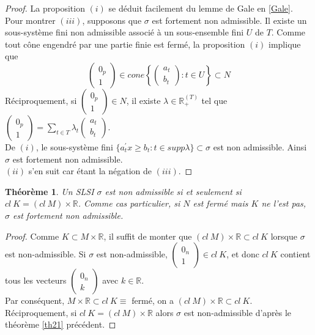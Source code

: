 \documentclass[11pt]{report}
\newenvironment{boxtheorem}
{\begin{tcolorbox}
		[enhanced jigsaw,breakable,pad at break*=2mm,
		colback=black!5,colframe=bleueLeger]}
	{\end{tcolorbox}}
\theoremstyle{styletheorem}
\newtheorem{theoreme}{Théorème}[section]
\newenvironment{theorem}
{\vspace*{0.3cm}\begin{boxtheorem}\begin{theoreme}}{\end{theoreme}\end{boxtheorem}\vspace*{0.3cm}}
\theoremstyle{styledef}
\theoremstyle{remark}
\newcommand{\ssi}{si et seulement si\  }
\newcommand{\R}{\ensuremath{\mathbb{R}}}
\begin{document}
\begin{proof}
	La proposition $(i)$ se déduit facilement du lemme de Gale en \ref{Gale}.
	Pour montrer $(iii)$, supposons que $\sigma$ est fortement non admissible. Il existe un sous-système fini non admissible associé à un sous-ensemble fini $U$ de $T$. Comme tout cône engendré par une partie  finie est fermé, la proposition $(i)$ implique que 
	$$\begin{pmatrix}
		0_p\\ 1
	\end{pmatrix} \in cone\left \lbrace \begin{pmatrix}
		a_t\\ b_t
	\end{pmatrix} \colon t \in U \right \rbrace \subset N$$
	Réciproquement, si $\begin{pmatrix}
		0_p\\ 1
	\end{pmatrix} \in N$, il existe $\lambda \in \R_+^{(T)}$ tel que $\begin{pmatrix}
		0_p\\ 1
	\end{pmatrix} =\sum_{t \in T} \lambda_t \begin{pmatrix}
		a_t\\ b_t
	\end{pmatrix}$.\\
	De $(i)$, le sous-système fini $\lbrace a_t^\prime  x \geq b_t \colon t \in supp\lambda \rbrace \subset \sigma $ est non admissible. Ainsi $\sigma$ est fortement non admissible.\\
	$(ii)$ s'en suit car étant la négation de $(iii)$.
\end{proof}
\begin{theorem}
	Un SLSI $\sigma$ est non admissible \ssi $cl\ K = (cl\ M)\times \R$. Comme cas particulier, si $N$ est fermé mais $K$ ne l'est pas, $\sigma$ est fortement non admissible.
\end{theorem}
\begin{proof}
	Comme $K \subset M\times \R$, il suffit de monter que $(cl \ M )\times \R \subset cl\ K$ lorsque $\sigma$ est non-admissible. Si $\sigma$ est non-admissible, $\begin{pmatrix}
		0_n\\ 1
	\end{pmatrix} \in cl\ K$, et donc $cl \ K$ contient tous les vecteurs $\begin{pmatrix}
		0_n\\ k
	\end{pmatrix} $ avec $k \in \R$.\\
	Par conséquent, $M\times \R \subset cl\ K\equiv$ fermé, on a $(cl\ M) \times \R \subset cl\ K$.\\ 
	Réciproquement, si $cl\ K=(cl\ M)\times \R$ alors $\sigma$ est non-admissible d'après le théorème \ref{th21} précédent.
	
\end{proof}
\end{document}
